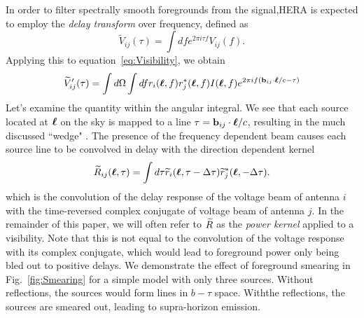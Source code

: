 \documentclass[twocolumn]{emulateapj}
\begin{document}
In order to filter spectrally smooth foregrounds from the signal,HERA is expected to employ the {\it delay transform} over frequency, defined as \citep{Parsons:2012}
\begin{equation}
\widetilde{V}_{ij}(\tau) = \int d f e^{2 \pi i \tau f} V_{ij}(f).
\end{equation}
Applying this to equation~\ref{eq:Visibility}, we obtain
\begin{equation}
\widetilde{V}'_{ij}(\tau)=  \int d \Omega \int d f  r_i(\bl,f) r_j^*(\bl,f)  I(\bl,f) e^{2 \pi i f ( \bb_{ij} \cdot \bl /c - \tau)}
\end{equation}
Let's examine the quantity within the angular integral. We see that each source located at $\boldsymbol{\ell}$ on the sky is mapped to a line $\tau ={\bf b}_{ij}\cdot \boldsymbol{\ell}/c$, resulting in the much discussed ``wedge" \citep{Datta:2010,Vedantham:2012,Parsons:2012,Morales:2012,Thyagarajan:2013,Liu:2014a,Liu:2014b}. The presence of the frequency dependent beam causes each source line to be convolved in delay with the direction dependent kernel
\begin{equation}\label{eq:Kernel}
\ftR_{ij}(\bl,\tau) = \int d \tau \ftr_i(\bl,\tau - \Delta \tau) \ftr^*_j(\bl,-\Delta \tau).
\end{equation}
which is the convolution of the delay response of the voltage beam of antenna $i$ with the time-reversed complex conjugate of voltage beam of antenna $j$. In the remainder of this paper, we will often refer to ${\widetilde{R}}$ as the {\it power kernel} applied to a visibility. Note that this is not equal to the convolution of the voltage response with its complex conjugate, which would lead to foreground power only being bled out to positive delays. We demonstrate the effect of foreground smearing in Fig.~\ref{fig:Smearing} for a simple model with only three sources. Without reflections, the sources would form lines in $b-\tau$ space. Withthe reflections, the sources are smeared out, leading to supra-horizon emission. 
\end{document}
